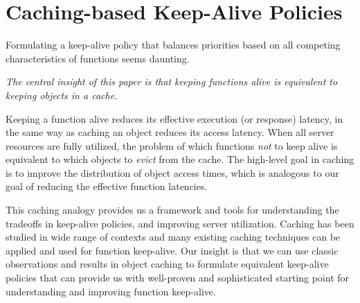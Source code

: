 
\section{Caching-based Keep-Alive Policies}
\label{sec:cache-keep-alive}
\vspace*{\subsecspace}


Formulating a keep-alive policy that balances priorities based on all competing characteristics of functions seems daunting. 
\begin{framed}
  \vspace*{-6pt}
  \noindent \emph{The central insight of this paper is that keeping functions alive is equivalent to keeping objects in a cache.}
  \vspace*{-6pt}
\end{framed}
\vspace*{-2pt}

\noindent Keeping a function alive reduces its effective execution (or response) latency, in the same way as caching an object reduces its access latency. 
When all server resources are fully utilized, the problem of which functions \emph{not} to keep alive is equivalent to which objects to \emph{evict} from the cache. 
The high-level goal in caching is to improve the distribution of object access times, which is analogous to our goal of reducing the effective function latencies. 


This caching analogy provides us a framework and tools for understanding the tradeoffs in keep-alive policies, and improving server utilization. 
Caching has been studied in wide range of contexts and many existing caching techniques can be applied and used for function keep-alive. 
Our insight is that we can use classic observations and results in object caching to formulate equivalent keep-alive policies that can provide us with well-proven and sophisticated starting point for understanding and improving function keep-alive.  


